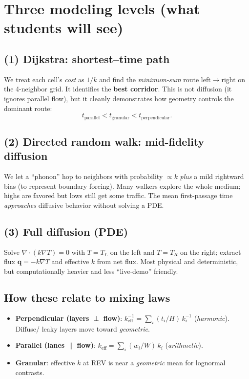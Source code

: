 \documentclass[11pt,a4paper]{article}
\begin{document}
\section{Three modeling levels (what students will see)}
\subsection*{(1) Dijkstra: shortest--time path}
We treat each cell's \emph{cost} as $1/k$ and find the \emph{minimum-sum} route left$\to$right on the 4-neighbor grid. It identifies the \textbf{best corridor}. This is not diffusion (it ignores parallel flow), but it cleanly demonstrates how geometry controls the dominant route:
\[
t_{\text{parallel}} < t_{\text{granular}} < t_{\text{perpendicular}}.
\]

\subsection*{(2) Directed random walk: mid-fidelity diffusion}
We let a “phonon” hop to neighbors with probability $\propto k$ \emph{plus} a mild rightward bias (to represent boundary forcing). Many walkers explore the whole medium; highs are favored but lows still get some traffic. The mean first-passage time \emph{approaches} diffusive behavior without solving a PDE.

\subsection*{(3) Full diffusion (PDE)}
Solve $\nabla\!\cdot(k\nabla T)=0$ with $T=T_L$ on the left and $T=T_R$ on the right; extract flux $\mathbf{q}=-k\nabla T$ and effective $k$ from net flux. Most physical and deterministic, but computationally heavier and less “live-demo” friendly.

\subsection*{How these relate to mixing laws}
\begin{itemize}[leftmargin=*]
\item \textbf{Perpendicular (layers $\perp$ flow)}: $k_{\text{eff}}^{-1} = \sum_i (t_i/H)\,k_i^{-1}$ (\emph{harmonic}). Diffuse/ leaky layers move toward \emph{geometric}.
\item \textbf{Parallel (lanes $\parallel$ flow)}: $k_{\text{eff}} = \sum_i (w_i/W)\,k_i$ (\emph{arithmetic}).
\item \textbf{Granular}: effective $k$ at REV is near a \emph{geometric} mean for lognormal contrasts.
\end{itemize}
\end{document}
